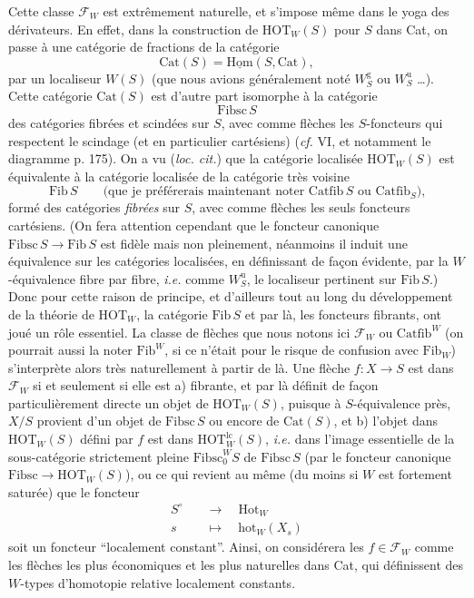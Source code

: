 \documentclass[11pt]{article}
\newcommand{\printedpage}[1]{\marginpar{\footnotesize p.~#1}}
\newcommand{\msp}[1]{\marginpar{\footnotesize [#1]}}
\newcommand{\Fib}{\mathrm{Fib}}
\newcommand{\Catfib}{\mathrm{Catfib}}
\newcommand{\Fibsc}{\mathrm{Fibsc}}
\newcommand{\Cat}{\mathrm{Cat}}
\newcommand{\HOT}{\mathrm{HOT}}
\begin{document}
\msp{page 33}

Cette classe $\mathcal{F}_W$ est extrêmement naturelle, et s'impose même dans le yoga des dérivateurs. En effet, dans la construction de $\HOT_W(S)$ pour $S$ dans Cat, on passe à une catégorie de fractions de la catégorie
\[
\Cat(S) = \underline{\mathrm{Hom}}(S, \Cat),
\]
par un localiseur $W(S)$ (que nous avions généralement noté $W_S^{\mathrm{g}}$ ou $W_S^{\mathrm{u}}$ \ldots). Cette catégorie $\Cat(S)$ est d'autre part isomorphe à la catégorie
\[
\Fibsc\, S
\]
des catégories fibrées et scindées sur $S$, avec comme flèches les $S$-foncteurs qui respectent le scindage (et en particulier cartésiens) (\textit{cf.} VI, et notamment le diagramme p. 175). On a vu (\textit{loc. cit.}) que la catégorie localisée $\HOT_W(S)$ est équivalente à la catégorie localisée de la catégorie très voisine
\[
\Fib\, S \qquad \text{(que je préférerais maintenant noter $\Catfib\, S$ ou $\Catfib_S$),}
\]
formé des catégories \textit{fibrées} sur $S$, avec comme \msp{page 34} flèches les seuls foncteurs cartésiens. (On fera attention cependant que le foncteur canonique $\Fibsc\, S \longrightarrow \Fib\, S$ est fidèle mais non pleinement, néanmoins il induit une équivalence sur les catégories localisées, en définissant de façon évidente, par la $W$-équivalence fibre par fibre, \textit{i.e.} comme $W_S^{\mathrm{u}}$, le localiseur pertinent sur $\Fib\, S$.) Donc pour cette raison de principe, et d'ailleurs tout au long du développement de la théorie de $\HOT_W$, la catégorie $\Fib\, S$ et par là, les foncteurs fibrants, ont joué un rôle essentiel. La classe de flèches que nous notons ici $\mathcal{F}_W$ ou $\Catfib^W$ (on pourrait aussi la noter $\Fib^W$, si ce n'était pour le risque de confusion avec $\Fib_W$) s'interprète alors très naturellement à partir de là. Une flèche $f : X \longrightarrow S$ est dans $\mathcal{F}_W$ si et seulement si elle est a) fibrante, et par là définit de façon particulièrement directe un objet de $\HOT_W(S)$, puisque à $S$-équivalence près, $X/S$ provient d'un objet de $\Fibsc\, S$ ou encore de $\Cat(S)$, \msp{page 35} et b) l'objet dans $\HOT_W(S)$ défini par $f$ est dans $\HOT_W^{\mathrm{lc}}(S)$, \textit{i.e.} dans l'image essentielle de la sous-catégorie strictement pleine $\Fibsc_0^W S$ de $\Fibsc\, S$ (par le foncteur canonique
\printedpage{22}
$\Fibsc \longrightarrow \HOT_W(S)$), ou ce qui revient au même (du moins si $W$ est fortement saturée) que le foncteur %
\[
\begin{aligned}
S^{\circ} \quad &\longrightarrow \quad \mathrm{Hot}_W \\
s \quad &\longmapsto \quad \mathrm{hot}_W(X_s)
\end{aligned}
\]
soit un foncteur “localement constant”. Ainsi, on considérera les $f \in \mathcal{F}_W$ comme les flèches les plus économiques et les plus naturelles dans Cat, qui définissent des $W$-types d'homotopie relative localement constants.
\end{document}

